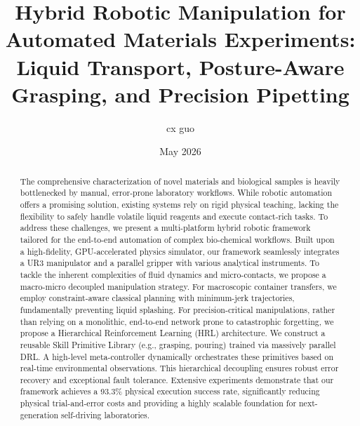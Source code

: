 \documentclass[journal,twocolumn]{IEEEtran}
\begin{document}
\title{Hybrid Robotic Manipulation for Automated Materials Experiments: Liquid Transport, Posture-Aware Grasping, and Precision Pipetting}
\author{cx guo}
\date{May 2026}

\maketitle

\begin{abstract}
The comprehensive characterization of novel materials and biological samples is heavily bottlenecked by manual, error-prone laboratory workflows. While robotic automation offers a promising solution, existing systems rely on rigid physical teaching, lacking the flexibility to safely handle volatile liquid reagents and execute contact-rich tasks. To address these challenges, we present a multi-platform hybrid robotic framework tailored for the end-to-end automation of complex bio-chemical workflows. Built upon a high-fidelity, GPU-accelerated physics simulator, our framework seamlessly integrates a UR3 manipulator and a parallel gripper with various analytical instruments. To tackle the inherent complexities of fluid dynamics and micro-contacts, we propose a macro-micro decoupled manipulation strategy. For macroscopic container transfers, we employ constraint-aware classical planning with minimum-jerk trajectories, fundamentally preventing liquid splashing. For precision-critical manipulations, rather than relying on a monolithic, end-to-end network prone to catastrophic forgetting, we propose a Hierarchical Reinforcement Learning (HRL) architecture. We construct a reusable Skill Primitive Library (e.g., grasping, pouring) trained via massively parallel DRL. A high-level meta-controller dynamically orchestrates these primitives based on real-time environmental observations. This hierarchical decoupling ensures robust error recovery and exceptional fault tolerance. Extensive experiments demonstrate that our framework achieves a 93.3\% physical execution success rate, significantly reducing physical trial-and-error costs and providing a highly scalable foundation for next-generation self-driving laboratories.
\end{abstract}
\end{document}
